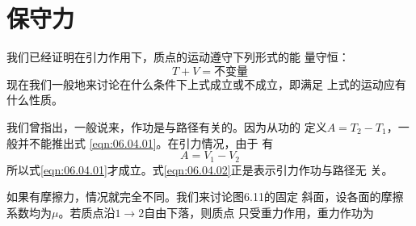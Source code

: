 \section{保守力}\label{sec:06.04}

我们已经证明在引力作用下，质点的运动遵守下列形式的能
量守恒：
\begin{equation}\label{eqn:06.04.01}
    T + V =  \text{不变量}
\end{equation}
现在我们一般地来讨论在什么条件下上式成立或不成立，即满足
上式的运动应有什么性质。

我们曾指出，一般说来，作功是与路径有关的。因为从功的
定义$  A = T _ { 2 } - T _ { 1 }   $，一般并不能推出式 \eqref{eqn:06.04.01}。在引力情况，由于
有
\begin{equation}\label{eqn:06.04.02}
    A = V _ { 1 } - V _ { 2 }
\end{equation}
所以式\eqref{eqn:06.04.01}才成立。式\eqref{eqn:06.04.02}正是表示引力作功与路径无
关。

如果有摩擦力，情况就完全不同。我们来讨论图6.11的固定
斜面，设各面的摩擦系数均为$ \mu $。若质点沿$ 1 \to 2 $自由下落，则质点
只受重力作用，重力作功为

